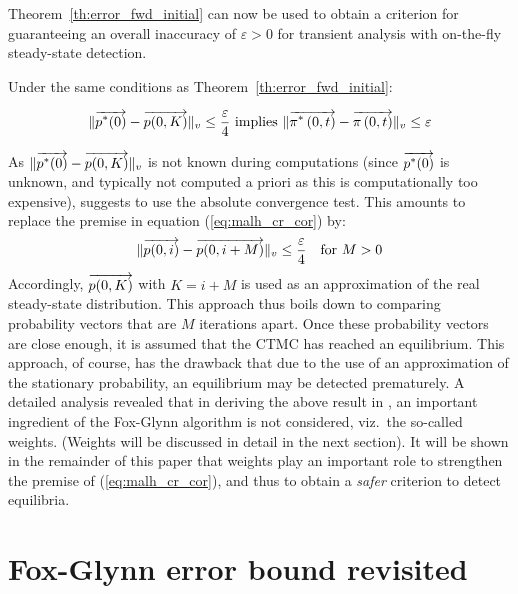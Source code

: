\documentclass{entcs}
\newcommand{\Section}[1]{\section{#1}}
\begin{document}
		Theorem~\ref{th:error_fwd_initial} can now be used to obtain a criterion for guaranteeing an overall inaccuracy of $\varepsilon > 0$ for transient analysis with on-the-fly steady-state detection.
		
		\begin{corollary}
			\label{cl:error_fwd_initial}
			Under the same conditions as Theorem~\ref{th:error_fwd_initial}:
				\begin{fframe}{0.88}{0.0}
					\begin{equation}
						\lVert \overrightarrow{p^{*}(0)} - \overrightarrow{p(0,K)} \rVert_{v} \leq \frac{\varepsilon}{4} \text{ implies } \lVert \overrightarrow{\pi^{*} \left(0, t \right )} - \overrightarrow{\pi \left(0, t \right )} \rVert_{v} \leq \varepsilon
						\label{eq:malh_cr_cor}
					\end{equation}
				\end{fframe}
 		\end{corollary}

		As $\lVert \overrightarrow{p^{*}(0)} - \overrightarrow{p(0,K)} \rVert_{v}$ is not known during computations (since $\overrightarrow{p^{*}(0)}$ is unknown, and typically not computed a priori as this is computationally too expensive), \cite{MalhotraMT_MR94} suggests to use the absolute convergence test.  This amounts to replace the premise in equation (\ref{eq:malh_cr_cor}) by:
		{\small
		\[
			\lVert \overrightarrow{p(0,i)} - \overrightarrow{p(0,i+M)} \rVert_{v} \leq \frac{\varepsilon}{4} \quad \mbox{for } M > 0
		\]
		}
		Accordingly, $\overrightarrow{p(0,K)}$ with $K = i{+}M$ is used as an approximation of the real steady-state distribution.  This approach thus boils down to comparing probability vectors that are $M$ iterations apart.  Once these probability vectors are close enough, it is assumed that the CTMC has reached an equilibrium.  This approach, of course, has the drawback that due to the use of an approximation of the stationary probability, an equilibrium may be detected prematurely.  A detailed analysis revealed that in deriving the above result in \cite{MalhotraMT_MR94},  an important ingredient of the Fox-Glynn algorithm is not considered, viz.\ the so-called weights.  (Weights will be discussed in detail in the next section). It will be shown in the remainder of this paper that weights play an important role to strengthen the premise of (\ref{eq:malh_cr_cor}), and thus to obtain a \emph{safer} criterion to detect equilibria.

\Section{Fox-Glynn error bound revisited \label{s:fox_glynn_ref}}
	
\end{document}
